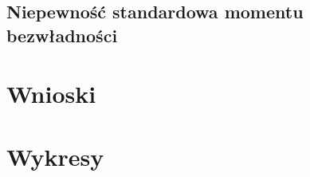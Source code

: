 \documentclass[a4paper,12pt]{article}
\begin{document}
\subsection{Niepewność standardowa momentu bezwładności}


\section{Wnioski}


\section{Wykresy}



\end{document}
